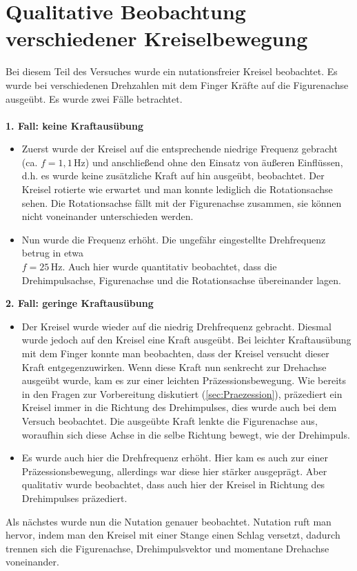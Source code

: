 \section{Qualitative Beobachtung verschiedener Kreiselbewegung}
Bei diesem Teil des Versuches wurde ein nutationsfreier Kreisel beobachtet. Es wurde bei verschiedenen Drehzahlen mit dem Finger Kräfte auf die Figurenachse ausgeübt. Es wurde zwei Fälle betrachtet.\\\\
\textbf{1. Fall: keine Kraftausübung}
\begin{itemize}
\item Zuerst wurde der Kreisel auf die entsprechende niedrige Frequenz gebracht (ca. \(f=1,1\,\text{Hz}\)) und anschließend ohne den Einsatz von äußeren Einflüssen, d.h. es wurde keine zusätzliche Kraft auf hin ausgeübt, beobachtet. Der Kreisel rotierte wie erwartet und man konnte lediglich die Rotationsachse sehen. Die Rotationsachse fällt mit der Figurenachse zusammen, sie können nicht voneinander unterschieden werden.
\item Nun wurde die Frequenz erhöht. Die ungefähr eingestellte Drehfrequenz betrug in etwa \\\(f=25\,\text{Hz}\). Auch hier wurde quantitativ beobachtet, dass die Drehimpulsachse, Figurenachse und die Rotationsachse übereinander lagen.
\end{itemize}
\textbf{2. Fall: geringe Kraftausübung}
\begin{itemize}  
\item Der Kreisel wurde wieder auf die niedrig Drehfrequenz gebracht. Diesmal wurde jedoch auf den Kreisel eine Kraft ausgeübt. Bei leichter Kraftausübung mit dem Finger konnte man beobachten, dass der Kreisel versucht dieser Kraft entgegenzuwirken. Wenn diese Kraft nun senkrecht zur Drehachse ausgeübt wurde, kam es zur einer leichten Präzessionsbewegung. Wie bereits in den Fragen zur Vorbereitung diskutiert (\ref{sec:Praezession}), präzediert ein Kreisel immer in die Richtung des Drehimpulses, dies wurde auch bei dem Versuch beobachtet. Die ausgeübte Kraft lenkte die Figurenachse aus, woraufhin sich diese Achse in die selbe Richtung bewegt, wie der Drehimpuls.  
\item Es wurde auch hier die Drehfrequenz erhöht. Hier kam es auch zur einer Präzessionsbewegung, allerdings war diese hier stärker ausgeprägt. Aber qualitativ wurde beobachtet, dass auch hier der Kreisel in Richtung des Drehimpulses präzediert.
\end{itemize}
\newpage
Als nächstes wurde nun die Nutation genauer beobachtet. Nutation ruft man hervor, indem man den Kreisel mit einer Stange einen Schlag  versetzt, dadurch trennen sich die Figurenachse, Drehimpulsvektor und momentane Drehachse voneinander.
